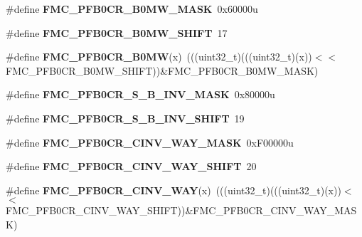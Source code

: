 \begin{DoxyCompactItemize}
\item 
\#define {\bfseries F\+M\+C\+\_\+\+P\+F\+B0\+C\+R\+\_\+\+B0\+M\+W\+\_\+\+M\+A\+SK}~0x60000u\hypertarget{group__FMC__Register__Masks_gac03a4c507c37a0a18312d87c64e1ec5d}{}\label{group__FMC__Register__Masks_gac03a4c507c37a0a18312d87c64e1ec5d}

\item 
\#define {\bfseries F\+M\+C\+\_\+\+P\+F\+B0\+C\+R\+\_\+\+B0\+M\+W\+\_\+\+S\+H\+I\+FT}~17\hypertarget{group__FMC__Register__Masks_gacfb3dd701c01e307d578e1fd0d048149}{}\label{group__FMC__Register__Masks_gacfb3dd701c01e307d578e1fd0d048149}

\item 
\#define {\bfseries F\+M\+C\+\_\+\+P\+F\+B0\+C\+R\+\_\+\+B0\+MW}(x)~(((uint32\+\_\+t)(((uint32\+\_\+t)(x))$<$$<$F\+M\+C\+\_\+\+P\+F\+B0\+C\+R\+\_\+\+B0\+M\+W\+\_\+\+S\+H\+I\+FT))\&F\+M\+C\+\_\+\+P\+F\+B0\+C\+R\+\_\+\+B0\+M\+W\+\_\+\+M\+A\+SK)\hypertarget{group__FMC__Register__Masks_ga5a6f11afbd35da0cef573491fa35d7b7}{}\label{group__FMC__Register__Masks_ga5a6f11afbd35da0cef573491fa35d7b7}

\item 
\#define {\bfseries F\+M\+C\+\_\+\+P\+F\+B0\+C\+R\+\_\+\+S\+\_\+\+B\+\_\+\+I\+N\+V\+\_\+\+M\+A\+SK}~0x80000u\hypertarget{group__FMC__Register__Masks_ga74a064f6c3eaf054162fde2404485904}{}\label{group__FMC__Register__Masks_ga74a064f6c3eaf054162fde2404485904}

\item 
\#define {\bfseries F\+M\+C\+\_\+\+P\+F\+B0\+C\+R\+\_\+\+S\+\_\+\+B\+\_\+\+I\+N\+V\+\_\+\+S\+H\+I\+FT}~19\hypertarget{group__FMC__Register__Masks_gaa086ecdb24a1217c39116b73aca5ac4f}{}\label{group__FMC__Register__Masks_gaa086ecdb24a1217c39116b73aca5ac4f}

\item 
\#define {\bfseries F\+M\+C\+\_\+\+P\+F\+B0\+C\+R\+\_\+\+C\+I\+N\+V\+\_\+\+W\+A\+Y\+\_\+\+M\+A\+SK}~0x\+F00000u\hypertarget{group__FMC__Register__Masks_gad64b080bc4174e9af7d04246befca017}{}\label{group__FMC__Register__Masks_gad64b080bc4174e9af7d04246befca017}

\item 
\#define {\bfseries F\+M\+C\+\_\+\+P\+F\+B0\+C\+R\+\_\+\+C\+I\+N\+V\+\_\+\+W\+A\+Y\+\_\+\+S\+H\+I\+FT}~20\hypertarget{group__FMC__Register__Masks_ga987dfe8d13ee805246f048943fcb9ee5}{}\label{group__FMC__Register__Masks_ga987dfe8d13ee805246f048943fcb9ee5}

\item 
\#define {\bfseries F\+M\+C\+\_\+\+P\+F\+B0\+C\+R\+\_\+\+C\+I\+N\+V\+\_\+\+W\+AY}(x)~(((uint32\+\_\+t)(((uint32\+\_\+t)(x))$<$$<$F\+M\+C\+\_\+\+P\+F\+B0\+C\+R\+\_\+\+C\+I\+N\+V\+\_\+\+W\+A\+Y\+\_\+\+S\+H\+I\+FT))\&F\+M\+C\+\_\+\+P\+F\+B0\+C\+R\+\_\+\+C\+I\+N\+V\+\_\+\+W\+A\+Y\+\_\+\+M\+A\+SK)\hypertarget{group__FMC__Register__Masks_ga7479958e36ef48e44a9342dde2f075df}{}\label{group__FMC__Register__Masks_ga7479958e36ef48e44a9342dde2f075df}


\end{DoxyCompactItemize}

